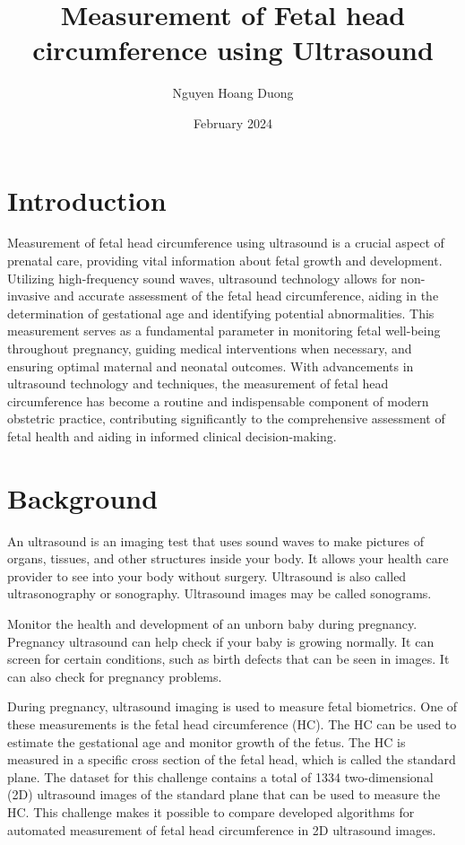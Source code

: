 \documentclass[twocolumn]{article}
\title{Measurement of Fetal head circumference using Ultrasound}
\author{Nguyen Hoang Duong}
\date{February 2024}
\begin{document}
\maketitle

\section{Introduction}
Measurement of fetal head circumference using ultrasound is a crucial aspect of prenatal care, providing vital information about fetal growth and development. Utilizing high-frequency sound waves, ultrasound technology allows for non-invasive and accurate assessment of the fetal head circumference, aiding in the determination of gestational age and identifying potential abnormalities. This measurement serves as a fundamental parameter in monitoring fetal well-being throughout pregnancy, guiding medical interventions when necessary, and ensuring optimal maternal and neonatal outcomes. With advancements in ultrasound technology and techniques, the measurement of fetal head circumference has become a routine and indispensable component of modern obstetric practice, contributing significantly to the comprehensive assessment of fetal health and aiding in informed clinical decision-making.

\section{Background}
An ultrasound is an imaging test that uses sound waves to make pictures of organs, tissues, and other structures inside your body. It allows your health care provider to see into your body without surgery. Ultrasound is also called ultrasonography or sonography. Ultrasound images may be called sonograms.

Monitor the health and development of an unborn baby during pregnancy. Pregnancy ultrasound can help check if your baby is growing normally. It can screen for certain conditions, such as birth defects that can be seen in images. It can also check for pregnancy problems.

During pregnancy, ultrasound imaging is used to measure fetal biometrics. One of these measurements is the fetal head circumference (HC). The HC can be used to estimate the gestational age and monitor growth of the fetus. The HC is measured in a specific cross section of the fetal head, which is called the standard plane. The dataset for this challenge contains a total of 1334 two-dimensional (2D) ultrasound images of the standard plane that can be used to measure the HC. This challenge makes it possible to compare developed algorithms for automated measurement of fetal head circumference in 2D ultrasound images. 
\end{document}
